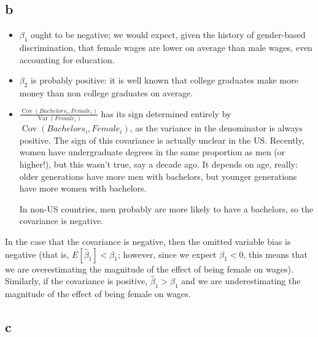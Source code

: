 \documentclass[12pt,letterpaper]{article}
\theoremstyle{definition}
\DeclareMathOperator{\Cov}{Cov}
\DeclareMathOperator{\Var}{Var}
\begin{document}
\subsection*{b}

\begin{itemize}
  \item \(\beta_{1}\) ought to be negative; we would expect, given the history of gender-based discrimination, that female wages are lower on average than male wages, even accounting for education.
  \item \(\beta_{2}\) is probably positive: it is well known that college graduates make more money than non college graduates on average.
  \item \(\frac{\Cov(Bachelors_{i}, Female_{i})}{\Var(Female_{i})}\) has its sign determined entirely by \(\Cov(Bachelors_{i}, Female_{i})\), as the variance in the denominator is always positive. The sign of this covariance is actually unclear in the US. Recently, women have undergraduate degrees in the same proportion as men (or higher!), but this wasn't true, say a decade ago. It depends on age, really: older generations have more men with bachelors, but younger generations have more women with bachelors.

    In non-US countries, men probably are more likely to have a bachelors, so the covariance is negative.
\end{itemize}

In the case that the covariance is negative, then the omitted variable bias is negative (that is, $E[\hat{\beta}_{1}] < \beta_{1}$; however, since we expect \(\beta_{1} < 0\), this means that we are overestimating the magnitude of the effect of being female on wages). Similarly, if the covariance is positive, \(\hat{\beta}_{1} > \beta_{1}\) and we are underestimating the magnitude of the effect of being female on wages.

\subsection*{c}
\end{document}

